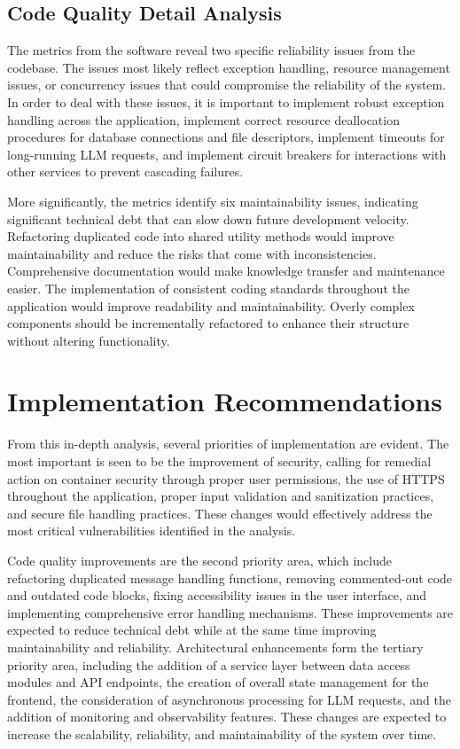 \documentclass[sigconf]{acmart}
\begin{document}
\subsection{Code Quality Detail Analysis}
The metrics from the software reveal two specific reliability issues from the codebase. The issues most likely reflect exception handling, resource management issues, or concurrency issues that could compromise the reliability of the system. In order to deal with these issues, it is important to implement robust exception handling across the application, implement correct resource deallocation procedures for database connections and file descriptors, implement timeouts for long-running LLM requests, and implement circuit breakers for interactions with other services to prevent cascading failures.

More significantly, the metrics identify six maintainability issues, indicating significant technical debt that can slow down future development velocity. Refactoring duplicated code into shared utility methods would improve maintainability and reduce the risks that come with inconsistencies. Comprehensive documentation would make knowledge transfer and maintenance easier. The implementation of consistent coding standards throughout the application would improve readability and maintainability. Overly complex components should be incrementally refactored to enhance their structure without altering functionality.

\section{Implementation Recommendations}
From this in-depth analysis, several priorities of implementation are evident. The most important is seen to be the improvement of security, calling for remedial action on container security through proper user permissions, the use of HTTPS throughout the application, proper input validation and sanitization practices, and secure file handling practices. These changes would effectively address the most critical vulnerabilities identified in the analysis.

Code quality improvements are the second priority area, which include refactoring duplicated message handling functions, removing commented-out code and outdated code blocks, fixing accessibility issues in the user interface, and implementing comprehensive error handling mechanisms. These improvements are expected to reduce technical debt while at the same time improving maintainability and reliability. Architectural enhancements form the tertiary priority area, including the addition of a service layer between data access modules and API endpoints, the creation of overall state management for the frontend, the consideration of asynchronous processing for LLM requests, and the addition of monitoring and observability features. These changes are expected to increase the scalability, reliability, and maintainability of the system over time.
\end{document}
